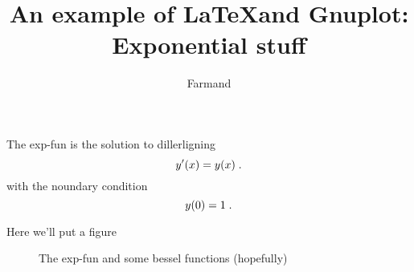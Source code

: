 \documentclass[twocolumn]{article}
\title{An example of \LaTeX and Gnuplot: Exponential stuff}
\author{Farmand}
\begin{document}
\maketitle
The exp-fun is the solution to dillerligning
\begin{equation}\label{diffeq}
y'(x) = y(x)\;.\\
\end{equation}
with the noundary condition
\begin{equation}\label{bounds}
y(0)=1\;.\\
\end{equation}

Here we'll put a figure

\begin{figure}[h]

\caption{The exp-fun and some bessel functions (hopefully)}
\end{figure}
\end{document}
